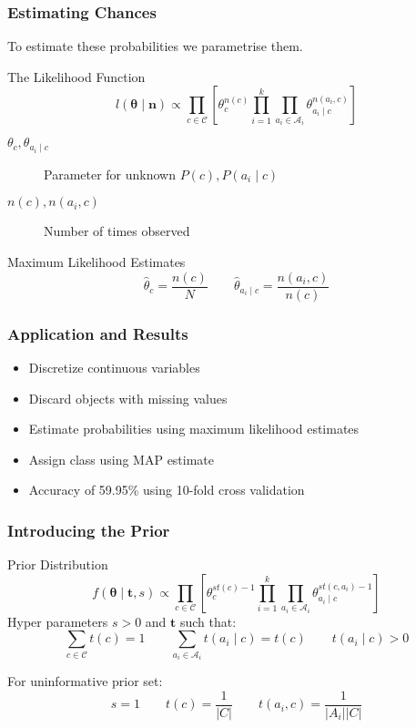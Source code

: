 \documentclass{beamer}
\begin{document}
\begin{frame}
	\frametitle{Estimating Chances}
	To estimate these probabilities we parametrise them.
	\begin{block}{The Likelihood Function}
		\begin{equation}\label{likelihood function}
			l(\mathbf{\theta} \mid \mathbf{n}) \propto \prod_{c \in \mathcal{C}} \left[ \theta_c^{n(c)} \prod_{i=1}^k \prod_{a_i \in \mathcal{A}_i} \theta_{a_i \mid c}^{n(a_i, c)} \right]
		\end{equation}
		\begin{description}
			\item[$\theta_c, \theta_{a_i \mid c}$] Parameter for unknown $P(c), P(a_i \mid c)$
			\item[$n(c), n(a_i, c)$] Number of times observed
		\end{description}
	\end{block}
	\begin{block}{Maximum Likelihood Estimates}
		\begin{equation}
			\hat{\theta}_c = \frac{n(c)}{N} \qquad \hat{\theta}_{a_i \mid c} = \frac{n(a_i, c)}{n(c)}
		\end{equation}
	\end{block}
\end{frame}

\begin{frame}
	\frametitle{Application and Results}
	\begin{itemize}
		\item Discretize continuous variables
		\item Discard objects with missing values
		\item Estimate probabilities using maximum likelihood estimates
		\item Assign class using MAP estimate
		\item Accuracy of 59.95\% using 10-fold cross validation
	\end{itemize}
\end{frame}

\begin{frame}
	\frametitle{Introducing the Prior}
	\begin{block}{Prior Distribution}
		\begin{equation}
			f(\mathbf{\theta} \mid \mathbf{t}, s) \propto \prod_{c \in \mathcal{C}} \left[ \theta_c^{st(c) - 1} \prod_{i=1}^k \prod_{a_i \in \mathcal{A}_i} \theta_{a_i \mid c}^{st(c, a_i) - 1} \right]
		\end{equation}
		Hyper parameters $s>0$ and $\mathbf{t}$ such that:
		\begin{equation}
			\sum_{c \in \mathcal{C}} t(c) = 1 \qquad \sum_{a_i \in \mathcal{A}_i} t(a_i \mid c) = t(c) \qquad t(a_i \mid c) > 0
		\end{equation}
	\end{block}
	For uninformative prior set:
	\begin{equation}
		s = 1 \qquad t(c) = \frac{1}{|C|} \qquad t(a_i, c) = \frac{1}{|A_i||C|}
	\end{equation}
\end{frame}
\end{document}
